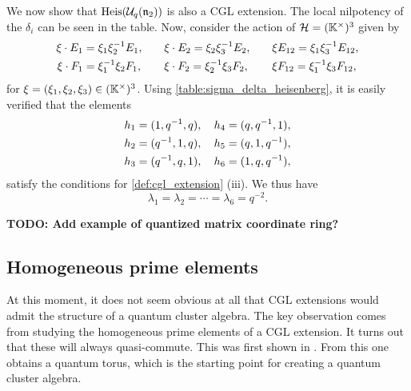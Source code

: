 \begin{example}
	We now show that $\operatorname{Heis}(\mathcal{U}_q(\mathfrak{n}_2))$ is also a CGL extension. The local nilpotency
	of the $\delta_i$ can be seen in the table. Now, consider the action of $\mathcal{H} =
		(\mathbb{K}^\times)^3$ given by
	\begin{align*}
		\xi \cdot E_1 & = \xi_1\xi_2^{-1} E_1, \quad &  & \xi \cdot E_2 = \xi_2\xi_3^{-1} E_2, \quad &  & \xi E_{12} = \xi_1 \xi_3^{-1} E_{12}, \\
		\xi \cdot F_1 & = \xi_1^{-1}\xi_2F_1, \quad  &  & \xi \cdot F_2 = \xi_2^{-1}\xi_3 F_2, \quad  &  & \xi F_{12} = \xi_1^{-1} \xi_3 F_{12},
	\end{align*}
	for $\xi = (\xi_1, \xi_2, \xi_3) \in (\mathbb{K}^\times)^3$. Using
	\cref{table:sigma_delta_heisenberg}, it is easily verified that the elements
	\begin{align*}
		h_1 & = (1, q^{-1}, q), \quad h_4 = (q, q^{-1}, 1), \\
		h_2 & = (q^{-1},1, q), \quad h_5 = (q,1, q^{-1}),   \\
		h_3 & = (q^{-1}, q, 1), \quad h_6 = (1, q, q^{-1}),
	\end{align*}
	satisfy the conditions for \cref{def:cgl_extension} (iii). We thus have
	\begin{equation}\label{eq:heisenberg_lambda_k}
		\lambda_1 = \lambda_2 = \cdots = \lambda_6 = q^{-2}.
	\end{equation}
\end{example}

\textbf{TODO: Add example of quantized matrix coordinate ring?}

\subsection{Homogeneous prime elements}

At this moment, it does not seem obvious at all that CGL extensions would admit the
structure of a quantum cluster algebra. The key observation comes from studying the
homogeneous prime elements of a CGL extension. It turns out that these will always
quasi-commute. This was first shown in \cite{GoodearlYakimov2016QuantumOre}. From this
one obtains a quantum torus, which is the starting point for creating a quantum cluster
algebra.

\medskip

